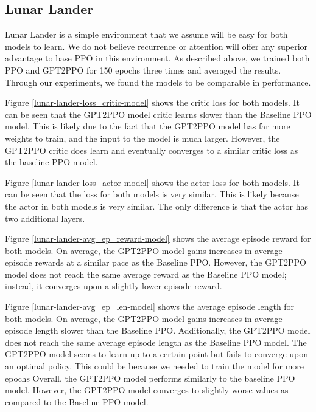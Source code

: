 \documentclass[conference]{IEEEtran}
\begin{document}
\subsection{Lunar Lander}

Lunar Lander is a simple environment that we assume will be easy for both models to learn. We do not believe recurrence or attention will offer any superior advantage to base PPO in this environment. As described above, we trained both PPO and GPT2PPO for 150 epochs three times and averaged the results. Through our experiments, we found the models to be comparable in performance.

Figure \ref{lunar-lander-loss_critic-model} shows the critic loss for both models. It can be seen that the GPT2PPO model critic learns slower than the Baseline PPO model. This is likely due to the fact that the GPT2PPO model has far more weights to train, and the input to the model is much larger. However, the GPT2PPO critic does learn and eventually converges to a similar critic loss as the baseline PPO model.

Figure \ref{lunar-lander-loss_actor-model} shows the actor loss for both models. It can be seen that the loss for both models is very similar. This is likely because the actor in both models is very similar. The only difference is that the actor has two additional layers.

Figure \ref{lunar-lander-avg_ep_reward-model} shows the average episode reward for both models. On average, the GPT2PPO model gains increases in average episode rewards at a similar pace as the Baseline PPO. However, the GPT2PPO model does not reach the same average reward as the Baseline PPO model; instead, it converges upon a slightly lower episode reward.

Figure \ref{lunar-lander-avg_ep_len-model} shows the average episode length for both models. On average, the GPT2PPO model gains increases in average episode length slower than the Baseline PPO. Additionally, the GPT2PPO model does not reach the same average episode length as the Baseline PPO model. The GPT2PPO model seems to learn up to a certain point but fails to converge upon an optimal policy. This could be because we needed to train the model for more epochs
Overall, the GPT2PPO model performs similarly to the baseline PPO model. However, the GPT2PPO model converges to slightly worse values as compared to the Baseline PPO model.
\end{document}
